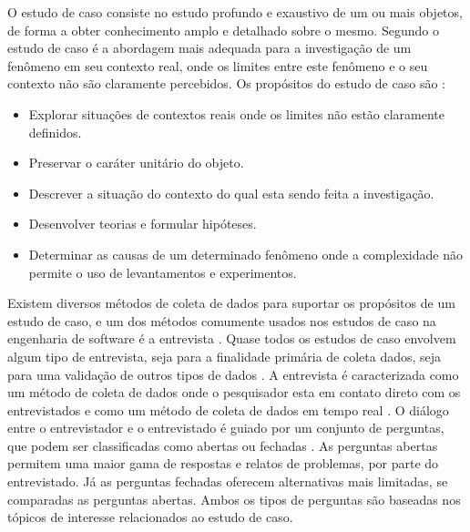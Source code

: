 O estudo de caso consiste no estudo profundo e exaustivo de um ou mais objetos, de forma a obter conhecimento amplo e detalhado sobre o mesmo. Segundo  o estudo de caso é a abordagem mais adequada para a investigação de um fenômeno em seu contexto real, onde os limites entre este fenômeno e o seu contexto não são claramente percebidos. Os propósitos do estudo de caso são \cite{gil2002}:

\begin{itemize}
\item Explorar situações de contextos reais onde os limites não estão claramente definidos.
\item Preservar o caráter unitário do objeto.
\item Descrever a situação do contexto do qual esta sendo feita a investigação.
\item Desenvolver teorias e formular hipóteses.
\item Determinar as causas de um determinado fenômeno onde a complexidade não permite o uso de levantamentos e experimentos.
\end{itemize}

Existem diversos métodos de coleta de dados para suportar os propósitos de um estudo de caso, e um dos métodos comumente usados nos estudos de caso na engenharia de software é a entrevista \cite{caseStudySE}. Quase todos os estudos de caso envolvem algum tipo de entrevista, seja para a finalidade primária de coleta dados, seja para uma validação de outros tipos de dados \cite{caseStudySE}. A entrevista é caracterizada como um método de coleta de dados onde o pesquisador esta em contato direto com os entrevistados e como um método de coleta de dados em tempo real \cite{caseStudySE}. O diálogo entre o entrevistador e o entrevistado é guiado por um conjunto de perguntas, que podem ser classificadas como abertas ou fechadas \cite{caseStudySE}. As perguntas abertas permitem uma maior gama de respostas e relatos de problemas, por parte do entrevistado. Já as perguntas fechadas oferecem alternativas mais limitadas, se comparadas as perguntas abertas. Ambos os tipos de perguntas são baseadas nos tópicos de interesse relacionados ao estudo de caso. 


